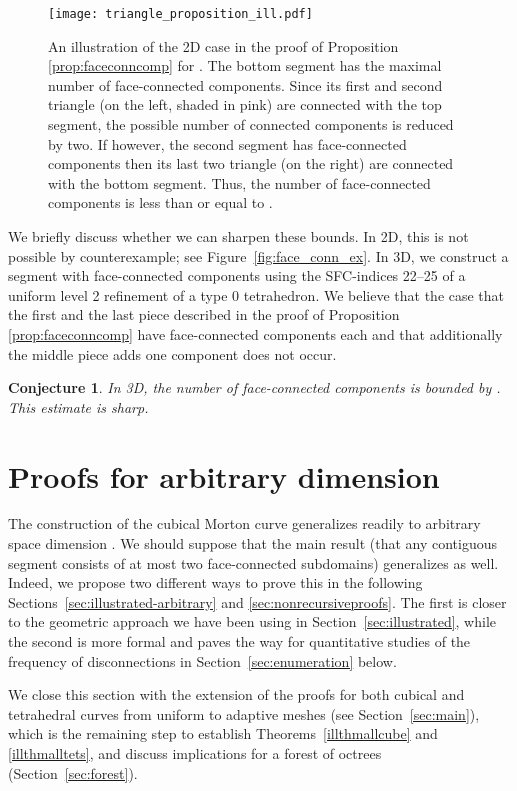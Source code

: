 \documentclass[a4paper,11pt]{article}
\newcommand{\seclab}[1]{\label{sec:#1}}
\newcommand{\secref}[1]{Section~\ref{sec:#1}}
\newtheorem{conj}[thm]{Conjecture}
\begin{document}
\begin{figure}
  \center
  \texttt{[image: triangle\_proposition\_ill.pdf]}
  \caption{An illustration of the 2D case in the proof of Proposition \ref{prop:faceconncomp} for 
  . The bottom segment has the maximal number of  face-connected components. 
  Since its first and second triangle (on the left, shaded in pink) are connected with the
  top segment, the possible number of connected components is reduced by two.
  If however, the second segment has  face-connected components then its last two
  triangle (on the right) are connected with the bottom segment.
  Thus, the number of face-connected components is less than or equal to .}
  \label{fig:explaintrianglprop}
\end{figure}

We briefly discuss whether we can sharpen these bounds.
In 2D, this is not possible by counterexample; see Figure~\ref{fig:face_conn_ex}.
In 3D, we construct a segment with  face-connected components using the
SFC-indices 22--25 of a uniform level 2 refinement of a type 0
tetrahedron.
We believe that the case that the first and the last piece described in
the proof of Proposition \ref{prop:faceconncomp} have  face-connected
components each and that additionally the middle piece adds one component
does not occur.
\begin{conj}
\label{con:3TMconjecture}
 In 3D, the number of face-connected components is bounded by .
 This estimate is sharp.
\end{conj}

\section{Proofs for arbitrary dimension}
\seclab{arbitrary}

The construction of the cubical Morton curve generalizes readily to
arbitrary space dimension .
We should suppose that the main result (that any contiguous segment consists of
at most two face-connected subdomains) generalizes as well.
Indeed, we propose two different ways to prove this in the following
Sections~\ref{sec:illustrated-arbitrary} and \ref{sec:nonrecursiveproofs}.
The first is closer to the geometric approach we have been using in
\secref{illustrated}, while the second is more formal and paves the way for
quantitative studies of the frequency of disconnections in \secref{enumeration}
below.

We close this section with the extension of the proofs for both cubical and
tetrahedral curves from uniform to adaptive meshes (see \secref{main}), which
is the remaining step to establish Theorems~\ref{illthmallcube} and
\ref{illthmalltets},
and discuss implications for a forest of octrees (\secref{forest}).
\end{document}
